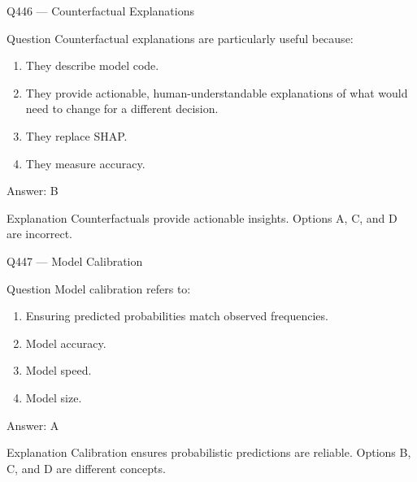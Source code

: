 \documentclass[aspectratio=169,8pt]{beamer}
\begin{document}
	\begin{frame}{Q446 --- Counterfactual Explanations}
		\begin{block}{Question}
			Counterfactual explanations are particularly useful because:
			\begin{enumerate}
				\item They describe model code.
				\item They provide actionable, human-understandable explanations of what would need to change for a different decision.
				\item They replace SHAP.
				\item They measure accuracy.
			\end{enumerate}
		\end{block}
		\begin{exampleblock}{Answer: B}\end{exampleblock}
		\begin{block}{Explanation}
			Counterfactuals provide actionable insights. Options A, C, and D are incorrect.
		\end{block}
	\end{frame}
	
	\begin{frame}{Q447 --- Model Calibration}
		\begin{block}{Question}
			Model calibration refers to:
			\begin{enumerate}
				\item Ensuring predicted probabilities match observed frequencies.
				\item Model accuracy.
				\item Model speed.
				\item Model size.
			\end{enumerate}
		\end{block}
		\begin{exampleblock}{Answer: A}\end{exampleblock}
		\begin{block}{Explanation}
			Calibration ensures probabilistic predictions are reliable. Options B, C, and D are different concepts.
		\end{block}
	\end{frame}
	
\end{document}
